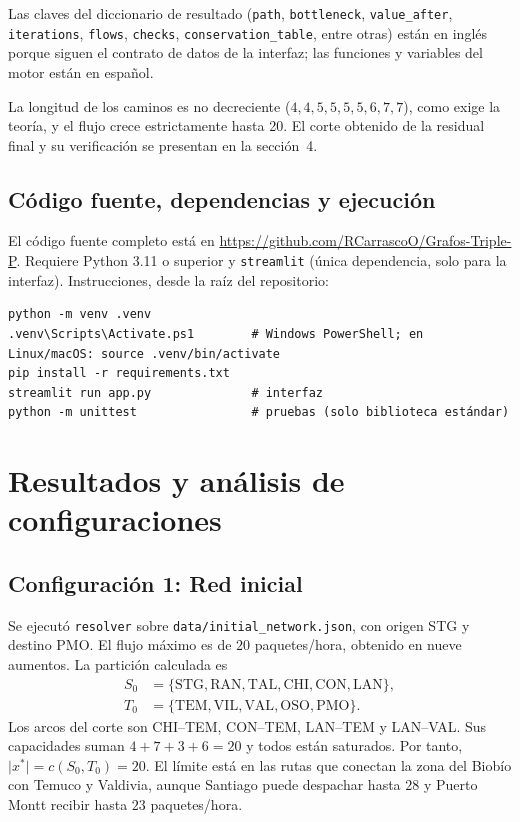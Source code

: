 \documentclass[12pt, a4paper]{article}
\begin{document}
Las claves del diccionario de resultado (\texttt{path}, \texttt{bottleneck}, \texttt{value\_after}, \texttt{iterations}, \texttt{flows}, \texttt{checks}, \texttt{conservation\_table}, entre otras) están en inglés porque siguen el contrato de datos de la interfaz; las funciones y variables del motor están en español.

La longitud de los caminos es no decreciente ($4,4,5,5,5,5,6,7,7$), como exige la teoría, y el flujo crece estrictamente hasta 20. El corte obtenido de la residual final y su verificación se presentan en la sección~4.

\subsection{Código fuente, dependencias y ejecución}

El código fuente completo está en \url{https://github.com/RCarrascoO/Grafos-Triple-P}. Requiere Python 3.11 o superior y \texttt{streamlit} (única dependencia, solo para la interfaz). Instrucciones, desde la raíz del repositorio:
\begin{lstlisting}[language={}]
python -m venv .venv
.venv\Scripts\Activate.ps1        # Windows PowerShell; en Linux/macOS: source .venv/bin/activate
pip install -r requirements.txt
streamlit run app.py              # interfaz
python -m unittest                # pruebas (solo biblioteca estándar)
\end{lstlisting}

\section{Resultados y análisis de configuraciones}

\subsection{Configuración 1: Red inicial}
Se ejecutó \texttt{resolver} sobre \texttt{data/initial\_network.json}, con origen STG y destino PMO. El flujo máximo es de $20$ paquetes/hora, obtenido en nueve aumentos. La partición calculada es
\begin{align*}
S_0 &= \{\text{STG},\text{RAN},\text{TAL},\text{CHI},\text{CON},\text{LAN}\},\\
T_0 &= \{\text{TEM},\text{VIL},\text{VAL},\text{OSO},\text{PMO}\}.
\end{align*}
Los arcos del corte son CHI--TEM, CON--TEM, LAN--TEM y LAN--VAL. Sus capacidades suman $4+7+3+6=20$ y todos están saturados. Por tanto, $\lvert x^*\rvert=c(S_0,T_0)=20$. El límite está en las rutas que conectan la zona del Biobío con Temuco y Valdivia, aunque Santiago puede despachar hasta $28$ y Puerto Montt recibir hasta $23$ paquetes/hora.
\end{document}
